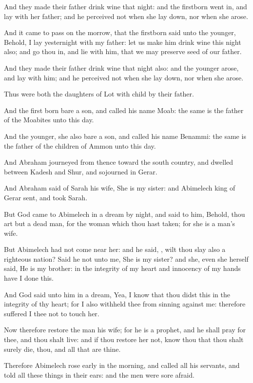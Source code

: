 \Verse And they made their father drink wine that night: and the firstborn went in, and lay with her father; and he perceived not when she lay down, nor when she arose.

\Verse And it came to pass on the morrow, that the firstborn said unto the younger, Behold, I lay yesternight with my father: let us make him drink wine this night also; and go thou in, and lie with him, that we may preserve seed of our father.

\Verse And they made their father drink wine that night also: and the younger arose, and lay with him; and he perceived not when she lay down, nor when she arose.

\Verse Thus were both the daughters of Lot with child by their father.

\Verse And the first born bare a son, and called his name Moab: the same is the father of the Moabites unto this day.

\Verse And the younger, she also bare a son, and called his name Benammi: the same is the father of the children of Ammon unto this day.

\Chapter
\Verse And Abraham journeyed from thence toward the south country, and dwelled between Kadesh and Shur, and sojourned in Gerar.

\Verse And Abraham said of Sarah his wife, She is my sister: and Abimelech king of Gerar sent, and took Sarah.

\Verse But God came to Abimelech in a dream by night, and said to him, Behold, thou art but a dead man, for the woman which thou hast taken; for she is a man's wife.

\Verse But Abimelech had not come near her: and he said, \LORD, wilt thou slay also a righteous nation?  \Verse Said he not unto me, She is my sister? and she, even she herself said, He is my brother: in the integrity of my heart and innocency of my hands have I done this.

\Verse And God said unto him in a dream, Yea, I know that thou didst this in the integrity of thy heart; for I also withheld thee from sinning against me: therefore suffered I thee not to touch her.

\Verse Now therefore restore the man his wife; for he is a prophet, and he shall pray for thee, and thou shalt live: and if thou restore her not, know thou that thou shalt surely die, thou, and all that are thine.

\Verse Therefore Abimelech rose early in the morning, and called all his servants, and told all these things in their ears: and the men were sore afraid.

